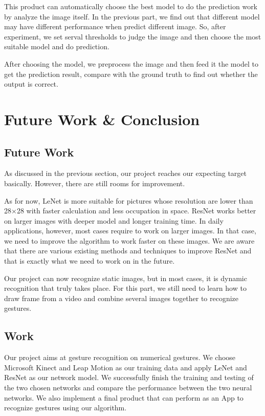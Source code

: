 \documentclass[12pt]{article}
\begin{document}
This product can automatically choose the best model to do the prediction work by analyze the image itself. In the previous part, we find out that different model may have different performance when predict different image. So, after experiment, we set serval thresholds to judge the image and then choose the most suitable model and do prediction. 

After choosing the model, we preprocess the image and then feed it the model to get the prediction result, compare with the ground truth to find out whether the output is correct.

\section{Future Work \& Conclusion}
\subsection{Future Work}
As discussed in the previous section, our project reaches our expecting target basically. However, there are still rooms for improvement. 

As for now, LeNet is more suitable for pictures whose resolution are lower than 28×28 with faster calculation and less occupation in space. ResNet works better on larger images with deeper model and longer training time. In daily applications, however, most cases require to work on larger images. In that case, we need to improve the algorithm to work faster on these images. We are aware that there are various existing methods and techniques to improve ResNet and that is exactly what we need to work on in the future.

Our project can now recognize static images, but in most cases, it is dynamic recognition that truly takes place. For this part, we still need to learn how to draw frame from a video and combine several images together to recognize gestures.

\subsection{Work}
Our project aims at gesture recognition on numerical gestures. We choose Microsoft Kinect and Leap Motion as our training data and apply LeNet and ResNet as our network model. We successfully finish the training and testing of the two chosen networks and compare the performance between the two neural networks. We also implement a final product that can perform as an App to recognize gestures using our algorithm.
\end{document}
